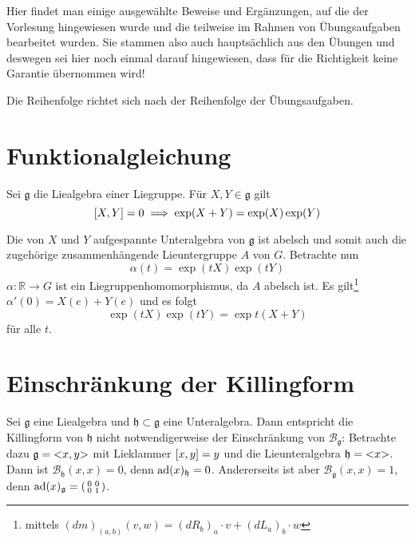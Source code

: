 Hier findet man einige ausgewählte Beweise und Ergänzungen, auf die der Vorlesung hingewiesen wurde und die teilweise im Rahmen von Übungsaufgaben bearbeitet wurden.
Sie stammen also auch hauptsächlich aus den Übungen und deswegen sei hier noch einmal darauf hingewiesen, dass für die Richtigkeit keine Garantie übernommen wird!

Die Reihenfolge richtet sich nach der Reihenfolge der Übungsaufgaben.

\section{Funktionalgleichung} %
\label{sec:funktionalgleichung}
Sei $\mathfrak{g}$ die Liealgebra einer Liegruppe.
Für $X,Y \in \mathfrak{g}$ gilt
\[
	\benbrace*{X,Y} = 0 \implies \exp(X+Y) = \exp(X) \exp(Y)
\]
\begin{beweis}
	Die von $X$ und $Y$ aufgespannte Unteralgebra von $\mathfrak{g}$ ist abelsch und somit auch die zugehörige zusammenhängende Lieuntergruppe $A$ von $G$.
	Betrachte nun
	\[
		\alpha(t) = \exp(t X) \exp(t Y)
	\]
	$\alpha \colon \mathbb{R} \to G$ ist ein Liegruppenhomomorphismus, da $A$ abelsch ist.
	Es gilt\footnote{mittels $(d m)_{(a,b)}(v,w) = (d R_b)_a \cdot v + (d L_a)_b \cdot w$} $\alpha'(0) = X(e) + Y(e)$ und es folgt
	\[
		\exp(t X) \exp(tY) = \exp t (X+Y)
	\]
	für alle $t$.
\end{beweis}

\section{Einschränkung der Killingform} %
\label{sec:einschr_killing}
Sei $\mathfrak{g}$ eine Liealgebra und $\mathfrak{h} \subset \mathfrak{g}$ eine Unteralgebra.
Dann entspricht die Killingform von $\mathfrak{h}$ nicht notwendigerweise der Einschränkung von $\mathcal{B}_{\mathfrak{g}}$: Betrachte dazu $\mathfrak{g} = \lenbrace{x,y}$ mit Lieklammer $\benbrace*{x,y} = y$ und die Lieunteralgebra $\mathfrak{h} = \lenbrace{x}$.  
Dann ist $\mathcal{B}_{\mathfrak{h}}(x,x) = 0$, denn $\ad(x)_{\mathfrak{h}} =0$.
Andererseits ist aber $\mathcal{B}_{\mathfrak{g}}(x,x) = 1$, denn $\ad(x)_\mathfrak{g} = \begin{psmallmatrix} 0 & 0 \\ 0 & 1 \end{psmallmatrix}$.

